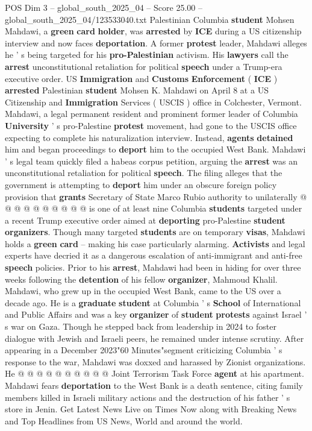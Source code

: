 \begin{textsample}{POS Dim 3 – global\_south\_2025\_04 – Score 25.00 – global\_south\_2025\_04/123533040.txt}  \label{ex:f3_pos_115}
Palestinian Columbia \textbf{student} Mohsen Mahdawi, a \textbf{green} \textbf{card} \textbf{holder}, was \textbf{arrested} by \textbf{ICE} during a US citizenship interview and now faces \textbf{deportation}.
A former \textbf{protest} leader, Mahdawi alleges he ' s being targeted for his \textbf{pro-Palestinian} activism.
His \textbf{lawyers} call the \textbf{arrest} unconstitutional retaliation for political \textbf{speech} under a Trump-era executive order.
US \textbf{Immigration} and \textbf{Customs} \textbf{Enforcement} ( \textbf{ICE} ) \textbf{arrested} Palestinian \textbf{student} Mohsen K.
Mahdawi on April 8 at a US Citizenship and \textbf{Immigration} Services ( USCIS ) office in Colchester, Vermont.
Mahdawi, a legal permanent resident and prominent former leader of Columbia \textbf{University} ' s pro-Palestine \textbf{protest} movement, had gone to the USCIS office expecting to complete his naturalization interview.
Instead, \textbf{agents} \textbf{detained} him and began proceedings to \textbf{deport} him to the occupied West Bank.
Mahdawi ' s legal team quickly filed a habeas corpus petition, arguing the \textbf{arrest} was an unconstitutional retaliation for political \textbf{speech}.
The filing alleges that the government is attempting to \textbf{deport} him under an obscure foreign policy provision that \textbf{grants} Secretary of State Marco Rubio authority to unilaterally @ @ @ @ @ @ @ @ @ @ is one of at least nine Columbia \textbf{students} targeted under a recent Trump executive order aimed at \textbf{deporting} pro-Palestine \textbf{student} \textbf{organizers}.
Though many targeted \textbf{students} are on temporary \textbf{visas}, Mahdawi holds a \textbf{green} \textbf{card} -- making his case particularly alarming. \textbf{Activists} and legal experts have decried it as a dangerous escalation of anti-immigrant and anti-free \textbf{speech} policies.
Prior to his \textbf{arrest}, Mahdawi had been in hiding for over three weeks following the \textbf{detention} of his fellow \textbf{organizer}, Mahmoud Khalil.
Mahdawi, who grew up in the occupied West Bank, came to the US over a decade ago.
He is a \textbf{graduate} \textbf{student} at Columbia ' s \textbf{School} of International and Public Affairs and was a key \textbf{organizer} of \textbf{student} \textbf{protests} against Israel ' s war on Gaza.
Though he stepped back from leadership in 2024 to foster dialogue with Jewish and Israeli peers, he remained under intense scrutiny.
After appearing in a December 2023"60 Minutes"segment criticizing Columbia ' s response to the war, Mahdawi was doxxed and harassed by Zionist organizations.
He @ @ @ @ @ @ @ @ @ @ Joint Terrorism Task Force \textbf{agent} at his apartment.
Mahdawi fears \textbf{deportation} to the West Bank is a death sentence, citing family members killed in Israeli military actions and the destruction of his father ' s store in Jenin.
Get Latest News Live on Times Now along with Breaking News and Top Headlines from US News, World and around the world.


\end{textsample}
